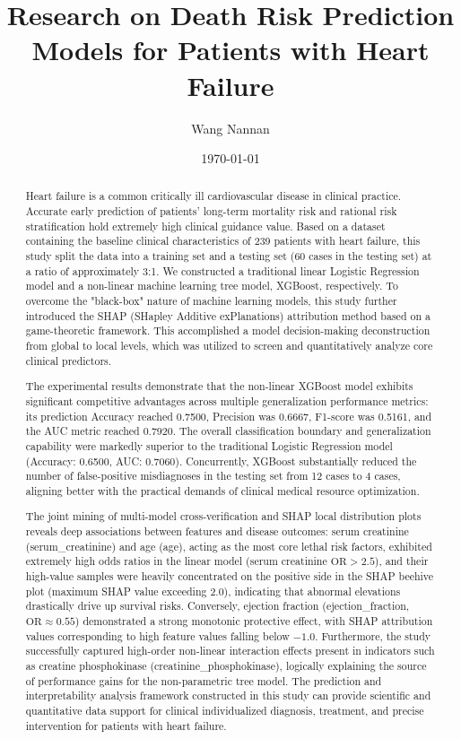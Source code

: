 \documentclass[11pt,a4paper]{article}
\title{Research on Death Risk Prediction Models for Patients with Heart Failure}
\author{Wang Nannan}
\date{\today}
\begin{document}
\maketitle %

\begin{abstract}
\begin{sloppypar}
Heart failure is a common critically ill cardiovascular disease in clinical practice. Accurate early prediction of patients' long-term mortality risk and rational risk stratification hold extremely high clinical guidance value. Based on a dataset containing the baseline clinical characteristics of 239 patients with heart failure, this study split the data into a training set and a testing set (60 cases in the testing set) at a ratio of approximately 3:1. We constructed a traditional linear Logistic Regression model and a non-linear machine learning tree model, XGBoost, respectively. To overcome the "black-box" nature of machine learning models, this study further introduced the SHAP (SHapley Additive exPlanations) attribution method based on a game-theoretic framework. This accomplished a model decision-making deconstruction from global to local levels, which was utilized to screen and quantitatively analyze core clinical predictors.

The experimental results demonstrate that the non-linear XGBoost model exhibits significant competitive advantages across multiple generalization performance metrics: its prediction Accuracy reached 0.7500, Precision was 0.6667, F1-score was 0.5161, and the AUC metric reached 0.7920. The overall classification boundary and generalization capability were markedly superior to the traditional Logistic Regression model (Accuracy: 0.6500, AUC: 0.7060). Concurrently, XGBoost substantially reduced the number of false-positive misdiagnoses in the testing set from 12 cases to 4 cases, aligning better with the practical demands of clinical medical resource optimization.

The joint mining of multi-model cross-verification and SHAP local distribution plots reveals deep associations between features and disease outcomes: serum creatinine (serum\_creatinine) and age (age), acting as the most core lethal risk factors, exhibited extremely high odds ratios in the linear model (serum creatinine $\text{OR} > 2.5$), and their high-value samples were heavily concentrated on the positive side in the SHAP beehive plot (maximum SHAP value exceeding 2.0), indicating that abnormal elevations drastically drive up survival risks. Conversely, ejection fraction (ejection\_fraction, $\text{OR} \approx 0.55$) demonstrated a strong monotonic protective effect, with SHAP attribution values corresponding to high feature values falling below $-1.0$. Furthermore, the study successfully captured high-order non-linear interaction effects present in indicators such as creatine phosphokinase (creatinine\_phosphokinase), logically explaining the source of performance gains for the non-parametric tree model. The prediction and interpretability analysis framework constructed in this study can provide scientific and quantitative data support for clinical individualized diagnosis, treatment, and precise intervention for patients with heart failure.


\end{sloppypar}
\end{abstract}
\end{document}

